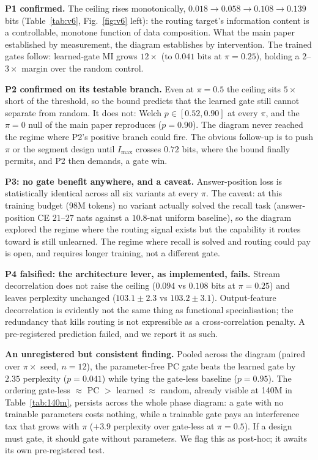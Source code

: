 \documentclass[11pt,a4paper]{article}
\begin{document}
\textbf{P1 confirmed.} The ceiling rises monotonically,
$0.018 \to 0.058 \to 0.108 \to 0.139$ bits (Table~\ref{tab:v6},
Fig.~\ref{fig:v6} left): the routing target's information content is a
controllable, monotone function of data composition. What the main paper
established by measurement, the diagram establishes by intervention. The
trained gates follow: learned-gate MI grows $12\times$ (to $0.041$ bits
at $\pi = 0.25$), holding a $2$--$3\times$ margin over the random
control.

\textbf{P2 confirmed on its testable branch.} Even at $\pi = 0.5$ the
ceiling sits $5\times$ short of the threshold, so the bound predicts
that the learned gate still cannot separate from random. It does not:
Welch $p \in [0.52, 0.90]$ at every $\pi$, and the $\pi = 0$ null of the
main paper reproduces ($p = 0.90$). The diagram never reached the regime
where P2's positive branch could fire. The obvious follow-up is to push
$\pi$ or the segment design until $I_{\max}$ crosses $0.72$ bits, where
the bound finally permits, and P2 then demands, a gate win.

\textbf{P3: no gate benefit anywhere, and a caveat.} Answer-position
loss is statistically identical across all six variants at every $\pi$.
The caveat: at this training budget (98M tokens) no variant actually
solved the recall task (answer-position CE $21$--$27$ nats against a
$10.8$-nat uniform baseline), so the diagram explored the regime where
the routing signal exists but the capability it routes toward is still
unlearned. The regime where recall is solved and routing could pay is
open, and requires longer training, not a different gate.

\textbf{P4 falsified: the architecture lever, as implemented, fails.}
Stream decorrelation does not raise the ceiling ($0.094$ vs $0.108$ bits
at $\pi = 0.25$) and leaves perplexity unchanged ($103.1 \pm 2.3$ vs
$103.2 \pm 3.1$). Output-feature decorrelation is evidently not the same
thing as functional specialisation; the redundancy that kills routing is
not expressible as a cross-correlation penalty. A pre-registered
prediction failed, and we report it as such.

\textbf{An unregistered but consistent finding.} Pooled across the
diagram (paired over $\pi \times$ seed, $n = 12$), the parameter-free PC
gate beats the learned gate by $2.35$ perplexity ($p = 0.041$) while
tying the gate-less baseline ($p = 0.95$). The ordering gate-less
$\approx$ PC $>$ learned $\approx$ random, already visible at 140M in
Table~\ref{tab:140m}, persists across the whole phase diagram: a gate
with no trainable parameters costs nothing, while a trainable gate pays
an interference tax that grows with $\pi$ ($+3.9$ perplexity over
gate-less at $\pi = 0.5$). If a design must gate, it should gate without
parameters. We flag this as post-hoc; it awaits its own pre-registered
test.
\end{document}
